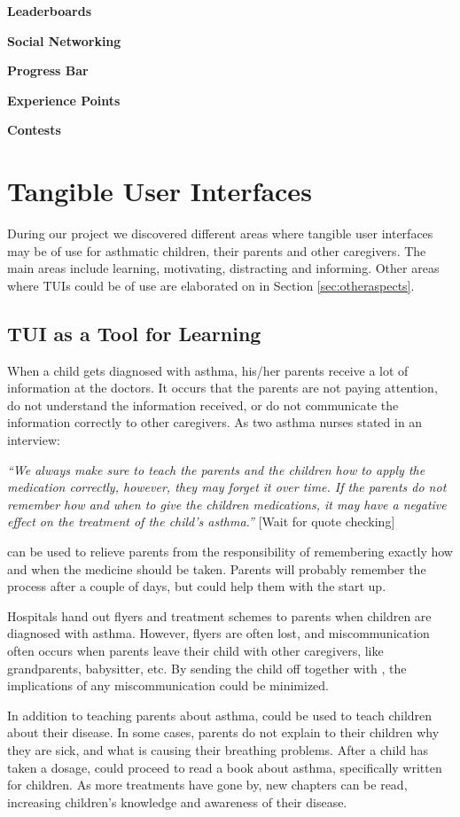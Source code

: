 \textbf{Leaderboards}

\textbf{Social Networking}

\textbf{Progress Bar}

\textbf{Experience Points}

\textbf{Contests}


\section{Tangible User Interfaces}
\label{sec:resultstui}
During our project we discovered different areas where tangible user interfaces may be of use for asthmatic children, their parents and other caregivers. The main areas include learning, motivating, distracting and informing. Other areas where TUIs could be of use are elaborated on in Section \ref{sec:otheraspects}.


\subsection{TUI as a Tool for Learning}
\label{sec:tuiasatoolforlearning}

When a child gets diagnosed with asthma, his/her parents receive a lot of information at the doctors. It occurs that the parents are not paying attention, do not understand the information received, or do not communicate the information correctly to other caregivers. As two asthma nurses stated in an interview: 

\textit{``We always make sure to teach the parents and the children how to apply the medication correctly, however, they may forget it over time. If the parents do not remember how and when to give the children medications, it may have a negative effect on the treatment of the child's asthma.''}
[Wait for quote checking]

\buddy{} can be used to relieve parents from the responsibility of remembering exactly how and when the medicine should be taken. Parents will probably remember the process after a couple of days, but \buddy{} could help them with the start up. 

Hospitals hand out flyers and treatment schemes to parents when children are diagnosed with asthma. However, flyers are often lost, and miscommunication often occurs when parents leave their child with other caregivers, like grandparents, babysitter, etc. By sending the child off together with \buddy{}, the implications of any miscommunication could be minimized.    

In addition to teaching parents about asthma, \buddy{} could be used to teach children about their disease. In some cases, parents do not explain to their children why they are sick, and what is causing their breathing problems. After a child has taken a dosage, \buddy{} could proceed to read a book about asthma, specifically written for children. As more treatments have gone by, new chapters can be read, increasing children's knowledge and awareness of their disease.   

